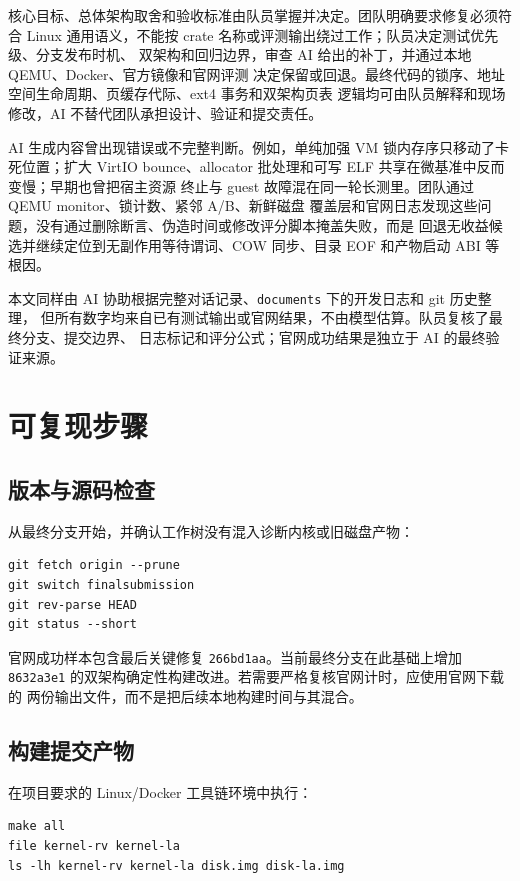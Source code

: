 \documentclass[UTF8,zihao=-4]{ctexart}
\newcommand{\code}{\nolinkurl}
\begin{document}
核心目标、总体架构取舍和验收标准由队员掌握并决定。团队明确要求修复必须符合 Linux
通用语义，不能按 crate 名称或评测输出绕过工作；队员决定测试优先级、分支发布时机、
双架构和回归边界，审查 AI 给出的补丁，并通过本地 QEMU、Docker、官方镜像和官网评测
决定保留或回退。最终代码的锁序、地址空间生命周期、页缓存代际、ext4 事务和双架构页表
逻辑均可由队员解释和现场修改，AI 不替代团队承担设计、验证和提交责任。

AI 生成内容曾出现错误或不完整判断。例如，单纯加强 VM 锁内存序只移动了卡死位置；扩大
VirtIO bounce、allocator 批处理和可写 ELF 共享在微基准中反而变慢；早期也曾把宿主资源
终止与 guest 故障混在同一轮长测里。团队通过 QEMU monitor、锁计数、紧邻 A/B、新鲜磁盘
覆盖层和官网日志发现这些问题，没有通过删除断言、伪造时间或修改评分脚本掩盖失败，而是
回退无收益候选并继续定位到无副作用等待谓词、COW 同步、目录 EOF 和产物启动 ABI 等根因。

本文同样由 AI 协助根据完整对话记录、\code{documents} 下的开发日志和 git 历史整理，
但所有数字均来自已有测试输出或官网结果，不由模型估算。队员复核了最终分支、提交边界、
日志标记和评分公式；官网成功结果是独立于 AI 的最终验证来源。

\section{可复现步骤}
\label{sec:reproduce}

\subsection{版本与源码检查}

从最终分支开始，并确认工作树没有混入诊断内核或旧磁盘产物：

\begin{Verbatim}[fontsize=\small,frame=single]
git fetch origin --prune
git switch finalsubmission
git rev-parse HEAD
git status --short
\end{Verbatim}

官网成功样本包含最后关键修复 \code{266bd1aa}。当前最终分支在此基础上增加
\code{8632a3e1} 的双架构确定性构建改进。若需要严格复核官网计时，应使用官网下载的
两份输出文件，而不是把后续本地构建时间与其混合。

\subsection{构建提交产物}

在项目要求的 Linux/Docker 工具链环境中执行：

\begin{Verbatim}[fontsize=\small,frame=single]
make all
file kernel-rv kernel-la
ls -lh kernel-rv kernel-la disk.img disk-la.img
\end{Verbatim}
\end{document}
